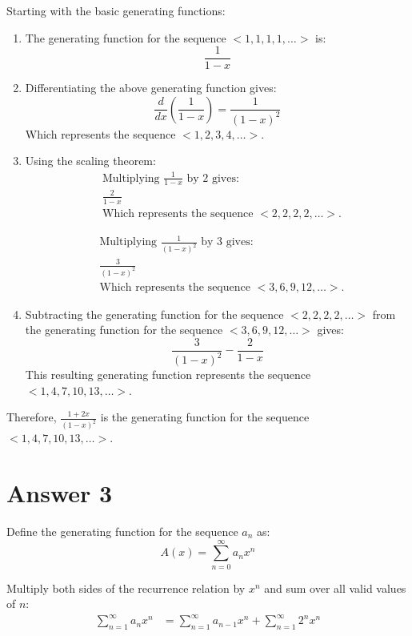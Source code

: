 \documentclass[12pt]{article}
\begin{document}
Starting with the basic generating functions:
\begin{enumerate}
    \item The generating function for the sequence \( <1, 1, 1, 1, \dots> \) is:
    \[ \frac{1}{1-x} \]

    \item Differentiating the above generating function gives:
    \[ \frac{d}{dx} \left( \frac{1}{1-x} \right) = \frac{1}{(1-x)^2} \]
    Which represents the sequence \( <1, 2, 3, 4, \dots> \).

    \item Using the scaling theorem:
    \begin{align*}
    &\text{Multiplying } \frac{1}{1-x} \text{ by 2 gives:} \\
    &\frac{2}{1-x} \\
    &\text{Which represents the sequence } <2, 2, 2, 2, \dots>.
    \end{align*}

    \begin{align*}
    &\text{Multiplying } \frac{1}{(1-x)^2} \text{ by 3 gives:} \\
    &\frac{3}{(1-x)^2} \\
    &\text{Which represents the sequence } <3, 6, 9, 12, \dots>.
    \end{align*}

    \item Subtracting the generating function for the sequence \( <2, 2, 2, 2, \dots> \) from the generating function for the sequence \( <3, 6, 9, 12, \dots> \) gives:
    \[ \frac{3}{(1-x)^2} - \frac{2}{1-x} \]
    This resulting generating function represents the sequence \( <1, 4, 7, 10, 13, \dots> \).
\end{enumerate}

Therefore, \( \frac{1+2x}{(1-x)^2} \)  is the generating function for the sequence \( <1, 4, 7, 10, 13, \dots> \).



\section*{Answer 3}

Define the generating function for the sequence \( a_n \) as:
\[ A(x) = \sum_{n=0}^{\infty} a_n x^n \]

Multiply both sides of the recurrence relation by \( x^n \) and sum over all valid values of \( n \):
\begin{align*}
\sum_{n=1}^{\infty} a_n x^n &= \sum_{n=1}^{\infty} a_{n-1} x^n + \sum_{n=1}^{\infty} 2^n x^n \\
\end{align*}
\end{document}
